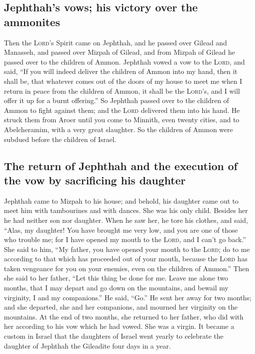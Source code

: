 \hypertarget{jephthahs-vows-his-victory-over-the-ammonites}{%
\subsection{Jephthah's vows; his victory over the
ammonites}\label{jephthahs-vows-his-victory-over-the-ammonites}}

 Then the \textsc{Lord}'s Spirit came on Jephthah, and he
passed over Gilead and Manasseh, and passed over Mizpah of Gilead, and
from Mizpah of Gilead he passed over to the children of Ammon.
 Jephthah vowed a vow to the \textsc{Lord}, and said,
``If you will indeed deliver the children of Ammon into my hand,
 then it shall be, that whatever comes out of the doors
of my house to meet me when I return in peace from the children of
Ammon, it shall be the \textsc{Lord}'s, and I will offer it up for a
burnt offering.''  So Jephthah passed over to the
children of Ammon to fight against them; and the \textsc{Lord} delivered
them into his hand.  He struck them from Aroer until you
come to Minnith, even twenty cities, and to Abelcheramim, with a very
great slaughter. So the children of Ammon were subdued before the
children of Israel.

\hypertarget{the-return-of-jephthah-and-the-execution-of-the-vow-by-sacrificing-his-daughter}{%
\subsection{The return of Jephthah and the execution of the vow by
sacrificing his
daughter}\label{the-return-of-jephthah-and-the-execution-of-the-vow-by-sacrificing-his-daughter}}

 Jephthah came to Mizpah to his house; and behold, his
daughter came out to meet him with tambourines and with dances. She was
his only child. Besides her he had neither son nor daughter.
 When he saw her, he tore his clothes, and said, ``Alas,
my daughter! You have brought me very low, and you are one of those who
trouble me; for I have opened my mouth to the \textsc{Lord}, and I can't
go back.''  She said to him, ``My father, you have opened
your mouth to the \textsc{Lord}; do to me according to that which has
proceeded out of your mouth, because the \textsc{Lord} has taken
vengeance for you on your enemies, even on the children of Ammon.''
 Then she said to her father, ``Let this thing be done
for me. Leave me alone two months, that I may depart and go down on the
mountains, and bewail my virginity, I and my companions.''
 He said, ``Go.'' He sent her away for two months; and
she departed, she and her companions, and mourned her virginity on the
mountains.  At the end of two months, she returned to her
father, who did with her according to his vow which he had vowed. She
was a virgin. It became a custom in Israel  that the
daughters of Israel went yearly to celebrate the daughter of Jephthah
the Gileadite four days in a year.

